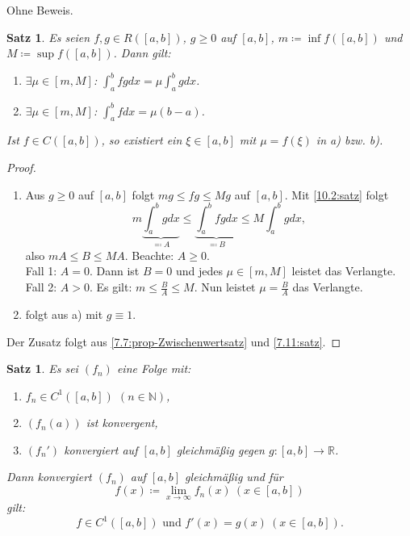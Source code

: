 \documentclass[12pt]{extreport} %
\newcommand{\N}{\mathbb{N}}
\newcommand{\R}{\mathbb{R}}
\theoremstyle{named}
\theoremstyle{itshape}
\newtheorem{satz}[unnamedtheorem]{Satz}
\theoremstyle{normal}
\begin{document}
{Ohne Beweis.

\begin{satz} \label{10.16:satz-Mittelwertsätze}
	Es seien $f, g \in R([a, b])$, $g \geq 0$ auf $[a, b]$, $m \coloneqq \inf f([a, b])$ und $M \coloneqq \sup f([a, b])$. Dann gilt:
	\begin{enumerate}
		\item $\exists \mu \in [m, M]$: $\int_{a}^{b} fg dx = \mu \int_{a}^{b} g dx$.
		\item $\exists \mu \in [m, M]$: $\int_{a}^{b} f dx = \mu (b - a)$.
	\end{enumerate}
	Ist $f \in C([a, b])$, so existiert ein $\xi \in [a, b]$ mit $\mu = f(\xi)$ in a) bzw. b).
\end{satz}

\begin{proof} ~\
	\begin{enumerate}
		\item Aus $g \geq 0$ auf $[a, b]$ folgt $mg \leq fg \leq Mg$ auf $[a, b]$. Mit \ref{10.2:satz} folgt
			$$ m \underbrace{\int_{a}^{b} g dx}_{\eqqcolon A} \leq \underbrace{\int_{a}^{b} fg dx}_{\eqqcolon B} \leq M \int_{a}^{b} g dx, $$
			also $m A \leq B \leq M A$. Beachte: $A \ge 0$. \\
			Fall 1: $A = 0$. Dann ist $B = 0$ und jedes $\mu \in [m, M]$ leistet das Verlangte. \\
			Fall 2: $A > 0$. Es gilt: $m \leq \frac{B}{A} \leq M$. Nun leistet $\mu =\frac{B}{A}$ das Verlangte.
		\item folgt aus a) mit $g \equiv 1$. 
	\end{enumerate}
	Der Zusatz folgt aus \ref{7.7:prop-Zwischenwertsatz} und \ref{7.11:satz}.
\end{proof}


\begin{satz} \label{10.17:satz}
	Es sei $(f_{n})$ eine Folge mit:
	\begin{enumerate}[label=\roman*\upshape)]
		\item $f_{n} \in C^{1}([a, b])$ $(n \in \N)$,
		\item $(f_{n}(a))$ ist konvergent,
		\item $(f_{n}')$ konvergiert auf $[a, b]$ gleichmä{\ss}ig gegen $g \colon [a, b] \rightarrow \R$.
	\end{enumerate}
	Dann konvergiert $(f_{n})$ auf $[a, b]$ gleichmä{\ss}ig und für $$f(x) \coloneqq \lim_{x \rightarrow \infty} f_{n}(x) ~(x \in [a, b])$$ gilt:
		$$ f \in C^{1}([a, b]) \text{ und } f'(x) = g(x) ~ (x \in  [a, b]). $$
\end{satz}

}
\end{document}
